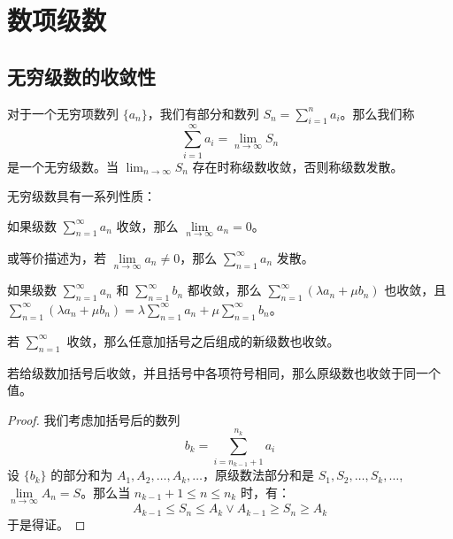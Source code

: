 \section{数项级数}

\subsection{无穷级数的收敛性}

\begin{definition}
    对于一个无穷项数列 $\{a_n\}$，我们有部分和数列 $S_n = \sum_{i=1}^{n} a_i$。那么我们称
    $$
    \sum_{i=1}^{\infty} a_i = \lim_{n \to \infty} S_n
    $$
    是一个无穷级数。当 $\lim_{n \to \infty} S_n$ 存在时称级数收敛，否则称级数发散。
\end{definition}

无穷级数具有一系列性质：

\begin{theorem}
    如果级数 $\sum\limits_{n = 1}^{\infty} a_n$ 收敛，那么 $\lim\limits_{n \to \infty} a_n = 0$。

    或等价描述为，若 $\lim\limits_{n \to \infty} a_n \neq 0$，那么 $\sum\limits_{n = 1}^{\infty} a_n$ 发散。
\end{theorem}

\begin{theorem}[线性性]
    如果级数 $\sum\limits_{n = 1}^{\infty} a_n$ 和 $\sum\limits_{n = 1}^{\infty} b_n$ 都收敛，那么 $\sum\limits_{n = 1}^{\infty} (\lambda a_n + \mu b_n)$ 也收敛，且
    $\sum\limits_{n = 1}^{\infty} (\lambda a_n + \mu b_n) = \lambda \sum\limits_{n = 1}^{\infty} a_n + \mu \sum\limits_{n = 1}^{\infty} b_n$。
\end{theorem}

\begin{theorem}
    若 $\sum\limits_{n = 1}^{\infty}$ 收敛，那么任意加括号之后组成的新级数也收敛。
\end{theorem}

\begin{theorem}
    若给级数加括号后收敛，并且括号中各项符号相同，那么原级数也收敛于同一个值。

    \begin{proof}
        我们考虑加括号后的数列
        $$
        b_k = \sum_{i = n_{k - 1} + 1}^{n_k} a_i
        $$
        设 $\{b_k\}$ 的部分和为 $A_1, A_2, \dots, A_k, \dots$，原级数法部分和是 $S_1, S_2, \dots, S_k, \dots$, $\lim\limits_{n \to \infty} A_n = S$。那么当 $n_{k - 1} + 1 \le n \le n_k$ 时，有：
        $$
        A_{k - 1} \le S_n \le A_k \lor A_{k - 1} \ge S_n \ge A_k
        $$
        于是得证。
    \end{proof}
\end{theorem}

